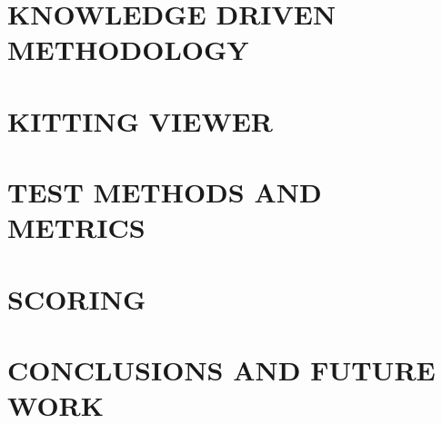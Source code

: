 \documentclass[letterpaper, 10 pt, conference]{ieeeconf}  %
\begin{document}
\section{KNOWLEDGE DRIVEN METHODOLOGY}
\label{sect:knowledge_driven_methodology}


\section{KITTING VIEWER}
\label{sect:KittingViewer}


\section{TEST METHODS AND METRICS}
\label{sect:Metrics}


\section{SCORING}
\label{sect:Scoring}





\section{CONCLUSIONS AND FUTURE WORK}
\label{sect:Conclusions}





\end{document}

